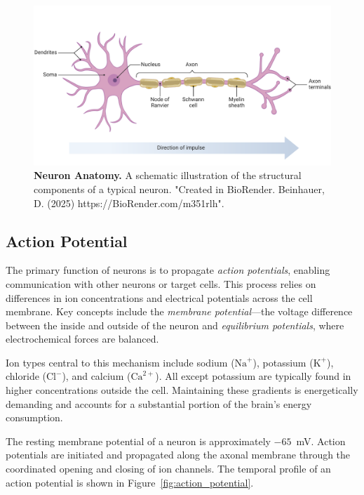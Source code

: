 \begin{figure}
    \centering
    \includegraphics[width=\linewidth]{img/neuron_anatomy.pdf}
    \caption{\textbf{Neuron Anatomy.} A schematic illustration of the structural components of a typical neuron. "Created in BioRender. Beinhauer, D. (2025) https://BioRender.com/m351rlh".}
    \label{fig:neuron}
\end{figure}

\subsection{Action Potential}
\label{subsec:action_potential}

The primary function of neurons is to propagate \emph{action potentials}, enabling communication with other neurons or target cells. This process relies on differences in ion concentrations and electrical potentials across the cell membrane. Key concepts include the \emph{membrane potential}—the voltage difference between the inside and outside of the neuron and \emph{equilibrium potentials}, where electrochemical forces are balanced.

Ion types central to this mechanism include sodium ($\text{Na}^+$), potassium ($\text{K}^+$), chloride ($\text{Cl}^-$), and calcium ($\text{Ca}^{2+}$). All except potassium are typically found in higher concentrations outside the cell. Maintaining these gradients is energetically demanding and accounts for a substantial portion of the brain's energy consumption.

The resting membrane potential of a neuron is approximately $-65$~mV. Action potentials are initiated and propagated along the axonal membrane through the coordinated opening and closing of ion channels. The temporal profile of an action potential is shown in Figure~\ref{fig:action_potential}.

